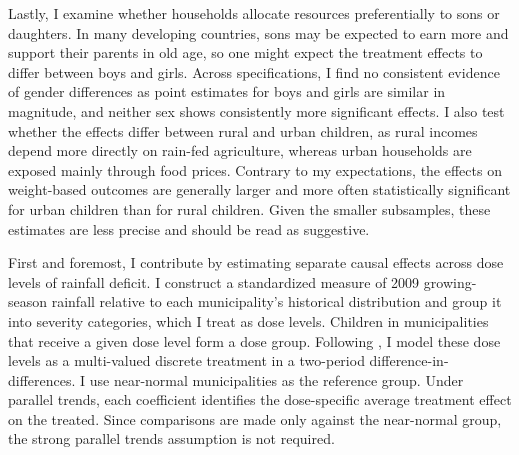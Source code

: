 \documentclass[12pt]{article}
\begin{document}
Lastly, I examine whether households allocate resources preferentially to sons or daughters. In many developing countries, sons may be expected to earn more and support their parents in old age, so one might expect the treatment effects to differ between boys and girls. Across specifications, I find no consistent evidence of gender differences as point estimates for boys and girls are similar in magnitude, and neither sex shows consistently more significant effects. I also test whether the effects differ between rural and urban children, as rural incomes depend more directly on rain-fed agriculture, whereas urban households are exposed mainly through food prices. Contrary to my expectations, the effects on weight-based outcomes are generally larger and more often statistically significant for urban children than for rural children. Given the smaller subsamples, these estimates are less precise and should be read as suggestive.

First and foremost, I contribute by estimating separate causal effects across dose levels of rainfall deficit. I construct a standardized measure of 2009 growing-season rainfall relative to each municipality's historical distribution and group it into severity categories, which I treat as dose levels. Children in municipalities that receive a given dose level form a dose group. Following \textcite{callawayDifferenceinDifferencesContinuousTreatment2024}, I model these dose levels as a multi-valued discrete treatment in a two-period difference-in-differences. I use near-normal municipalities as the reference group. Under parallel trends, each coefficient identifies the dose-specific average treatment effect on the treated. Since comparisons are made only against the near-normal group, the strong parallel trends assumption is not required.
\end{document}
